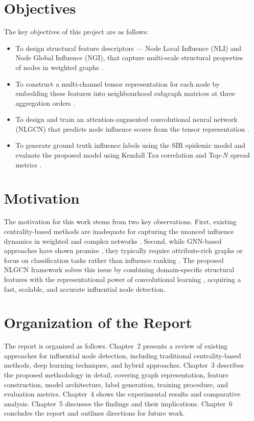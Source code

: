 \section{Objectives}

The key objectives of this project are as follows:
\begin{itemize}
    \item To design structural feature descriptors --- Node Local
    Influence (NLI) and Node Global Influence (NGI), that capture
    multi-scale structural properties of nodes in weighted graphs
    \cite{guo2026, mukhtar}.

    \item To construct a multi-channel tensor representation for each
    node by embedding these features into neighbourhood subgraph
    matrices at three aggregation orders \cite{guo2026, tu2025}.

    \item To design and train an attention-augmented convolutional neural
    network (NLGCN) that predicts node influence scores from the tensor
    representation \cite{ zhang2019gcn}.

    \item To generate ground truth influence labels using the SIR
    epidemic model and evaluate the proposed model
    using Kendall Tau correlation and Top-$N$ spread
    metrics \cite{guo2026}.
\end{itemize}

\section{Motivation}

The motivation for this work stems from two key observations. First,
existing centrality-based methods are inadequate for capturing the
nuanced influence dynamics in weighted and complex networks
\cite{chen2012, mukhtar, farooq2018}. Second, while GNN-based
approaches have shown promise \cite{zhang2019gcn, patel2025},
they typically require attribute-rich graphs or focus on classification
tasks rather than influence ranking \cite{thotakura2024, tu2025}. The proposed NLGCN framework solves this issue by combining domain-specific
structural features with the representational power of convolutional
learning \cite{guo2026}, acquiring a fast, scalable, and accurate
influential node detection.

\section{Organization of the Report}

The report is organized as follows. Chapter~2
presents a review of existing approaches for influential node detection, including traditional centrality-based methods, deep learning techniques, and hybrid approaches. Chapter~3
describes the proposed methodology in detail, covering graph
representation, feature construction, model architecture, label
generation, training procedure, and evaluation metrics. Chapter~4
shows the experimental results and comparative analysis. Chapter~5
discusses the findings and their implications. Chapter~6 concludes the
report and outlines directions for future work.